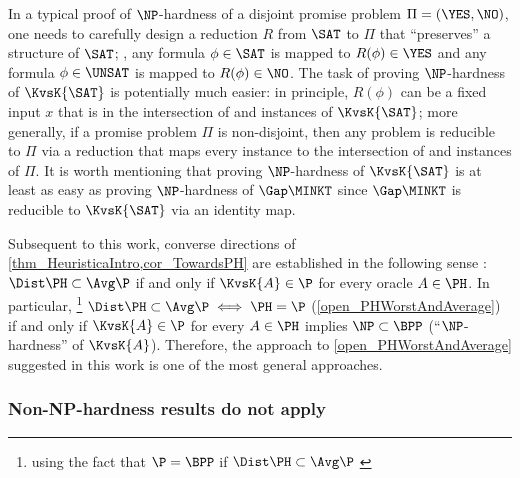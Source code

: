 \documentclass{toc}
\begin{document}
In a typical proof of $\NP$-hardness of a disjoint promise problem $\Pi = (\YES, \NO)$,
one needs to carefully design
a reduction $R$ from $\SAT$ to $\Pi$
that ``preserves'' a structure of $\SAT$;
\ie,
any formula $\phi \in \SAT$ is mapped to $R(\phi) \in \YES$
and
any formula $\phi \in \UNSAT$ is mapped to $R(\phi) \in \NO$.
The task of proving $\NP$-hardness of $\KvsK{\SAT}$
is potentially much easier:
in principle, $R(\phi)$ can be a fixed input $x$ that is in the intersection of
\Yes and \No instances of $\KvsK{\SAT}$;
more generally, if a promise problem $\Pi$ is non-disjoint,
then any problem is reducible to $\Pi$ via a reduction that maps every instance
to the intersection of \Yes and \No instances of $\Pi$.
%
%
%
%
%
%
%
%
%
%
%
%
It is worth mentioning that
proving $\NP$-hardness of $\KvsK{\SAT}$
is at least as easy as proving $\NP$-hardness of $\Gap\MINKT$
since
$\Gap\MINKT$ is reducible to $\KvsK{\SAT}$ via an identity map.
%
%
%
%

Subsequent to this work, converse directions of \cref{thm_HeuristicaIntro,cor_TowardsPH} are established in the following sense \cite{Hirahara20_focs_conf}:
$\Dist\PH \subset \Avg\P$ if and only if $\KvsK{A} \in \P$ for every oracle $A \in \PH$.
In particular,%
\footnote{using the fact that $\P = \BPP$ if $\Dist\PH \subset \Avg\P$ \cite{BuhrmanFP05_mst_journals}}
$\Dist\PH \subset \Avg\P \iff \PH = \P$ (\cref{open_PHWorstAndAverage}) if and only if $\KvsK{A} \in \P$ for every $A \in \PH$ implies $\NP \subset \BPP$
(``$\NP$-hardness'' of $\KvsK{A}$).
Therefore, the approach to \cref{open_PHWorstAndAverage} suggested in this work
is one of the most general approaches.

\subsubsection{Non-NP-hardness results do not apply}
\end{document}
